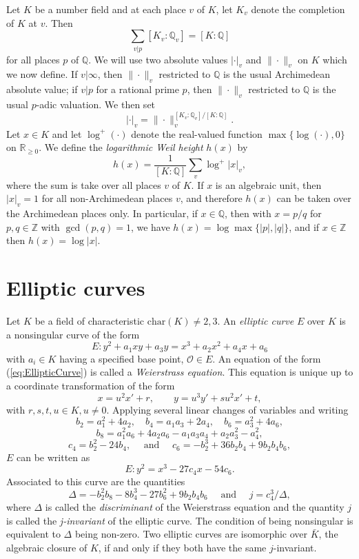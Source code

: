\documentclass[11pt]{report}
\theoremstyle{definition}
\begin{document}
Let $K$ be a number field and at each place $v$ of $K$, let $K_v$ denote the completion of $K$ at $v$. Then
\[\sum_{v|p} [K_v:\mathbb{Q}_v] = [K:\mathbb{Q}]\]
for all places $p$ of $\mathbb{Q}$. We will use two absolute values $| \cdot |_v$ and $\| \cdot \|_v$ on $K$ which we now define. If $v|\infty$, then $\| \cdot \|_v$ restricted to $\mathbb{Q}$ is the usual Archimedean absolute value; if $v|p$ for a rational prime $p$, then $\| \cdot \|_v$ restricted to $\mathbb{Q}$ is the usual $p$-adic valuation. We then set
\[ | \cdot |_v = \| \cdot \|_v^{[K_v:\mathbb{Q}_v]/[K:\mathbb{Q}]}.\]
Let $x \in K$ and let $\log^+(\cdot)$ denote the real-valued function $\max\{\log(\cdot),0\}$ on $\mathbb{R}_{\geq 0}$. We define the \textit{logarithmic Weil height} $h(x)$ by
\[h(x) = \frac{1}{[K:\mathbb{Q}]}\sum_v \log^+|x|_v,\]
where the sum is take over all places $v$ of $K$. If $x$ is an algebraic unit, then $|x|_v = 1$ for all non-Archimedean places $v$, and therefore $h(x)$ can be taken over the Archimedean places only.
In particular, if $x \in \mathbb{Q}$, then with $x = p/q$ for $p,q \in \mathbb{Z}$ with $\gcd(p,q) = 1$, we have $h(x) = \log\max\{|p|,|q|\}$, and if $x \in \mathbb{Z}$ then $h(x) = \log|x|$.



\section{Elliptic curves}
\label{sec:EllipticCurves}

Let $K$ be a field of characteristic $\text{char}(K) \neq 2,3$. An \textit{elliptic curve} $E$ over $K$ is a nonsingular curve of the form
\begin{equation} \label{eq:EllipticCurve}
E: y^2 + a_1xy + a_3y = x^3 + a_2x^2 + a_4x + a_6
\end{equation}
with $a_i \in K$ having a specified base point, $\mathcal{O}\in E$. An equation of the form (\ref{eq:EllipticCurve}) is called a \textit{Weierstrass equation}. This equation is unique up to a coordinate transformation of the form
\[x = u^2x' + r, \quad\quad y = u^3y' + su^2x' + t, \]
with $r,s,t,u \in K, u\neq 0$.
Applying several linear changes of variables and writing
\[b_2 = a_1^2 + 4a_2, \quad b_4 = a_1a_3 + 2a_4, \quad b_6 = a_3^2 + 4a_6,\]
\[b_8 = a_1^2a_6 + 4a_2a_6 - a_1a_3a_4 + a_2a_3^2 - a_4^2,\]
\[ c_4 = b_2^2 - 24b_4, \quad \text{ and } \quad c_6 = -b_2^3 + 36b_2b_4 + 9b_2b_4b_6,\]
$E$ can be written as
\[E: y^2 = x^3 - 27c_4x - 54c_6.\]
Associated to this curve are the quantities
\[\Delta = -b_2^2b_8 - 8b_4^3 - 27b_6^2 + 9b_2b_4b_6 \quad \text{ and } \quad j = c_4^3/\Delta,\]
where $\Delta$ is called the \textit{discriminant} of the Weierstrass equation and the quantity $j$ is called the \textit{j-invariant} of the elliptic curve. The condition of being nonsingular is equivalent to $\Delta$ being non-zero. Two elliptic curves are isomorphic over $\bar{K}$, the algebraic closure of $K$, if and only if they both have the same $j$-invariant.
\end{document}
